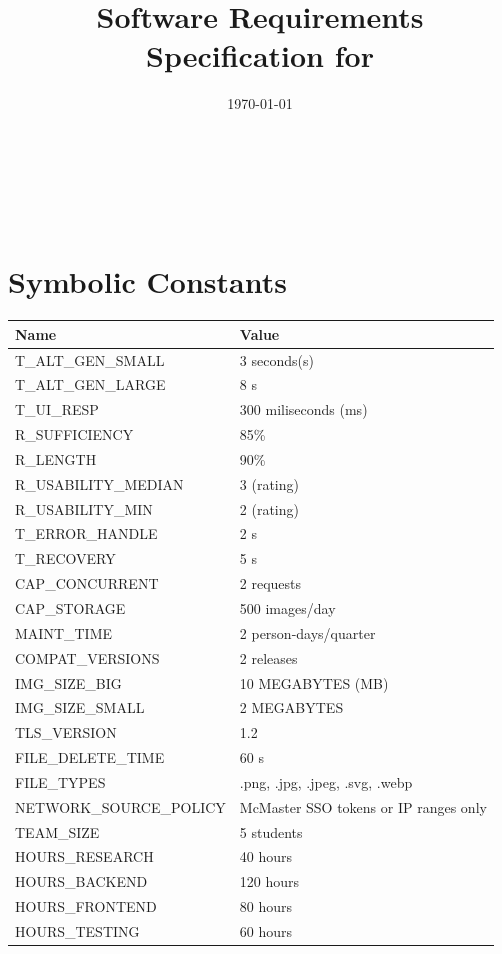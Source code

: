 \documentclass[12pt]{article}
\begin{document}
\title{Software Requirements Specification for \progname}
\author{\authname}
\date{\today}

\maketitle

~\newpage


\tableofcontents
~\newpage

\section*{Symbolic Constants}
\begin{tabularx}{\textwidth}{|X|X|}
\toprule {\textbf{Name}} & {\textbf{Value}}\\
\midrule
T\_ALT\_GEN\_SMALL & 3 seconds(s) \\
T\_ALT\_GEN\_LARGE & 8 s \\
T\_UI\_RESP & 300 miliseconds (ms) \\
R\_SUFFICIENCY & 85\% \\
R\_LENGTH & 90\% \\
R\_USABILITY\_MEDIAN & 3 (rating) \\
R\_USABILITY\_MIN & 2 (rating) \\
T\_ERROR\_HANDLE & 2 s \\
T\_RECOVERY & 5 s \\
CAP\_CONCURRENT & 2 requests \\
CAP\_STORAGE & 500 images/day \\
MAINT\_TIME & 2 person-days/quarter \\
COMPAT\_VERSIONS & 2 releases \\
IMG\_SIZE\_BIG & 10 MEGABYTES (MB) \\
IMG\_SIZE\_SMALL & 2 MEGABYTES \\
TLS\_VERSION & 1.2 \\ 
FILE\_DELETE\_TIME & 60 s \\
FILE\_TYPES & .png, .jpg, .jpeg, .svg, .webp \\
NETWORK\_SOURCE\_POLICY & McMaster SSO tokens or IP ranges only\\
TEAM\_SIZE & 5 students \\
HOURS\_RESEARCH & 40 hours \\
HOURS\_BACKEND & 120 hours \\
HOURS\_FRONTEND & 80 hours \\
HOURS\_TESTING & 60 hours \\

\end{tabularx}
\end{document}
